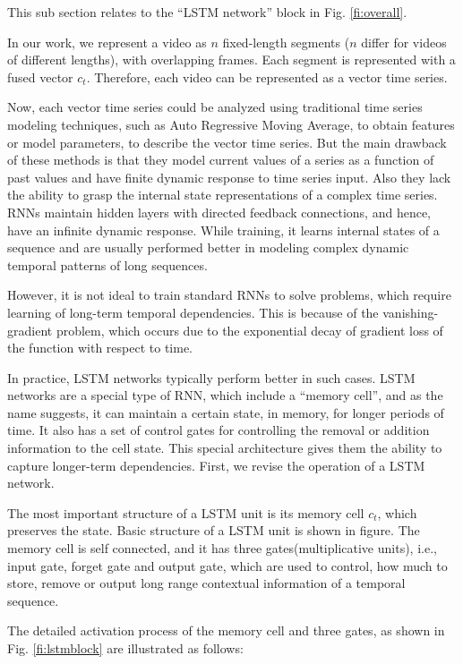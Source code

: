 This sub section relates to
the ``LSTM network'' block in Fig. \ref{fi:overall}.

In our work, we represent a video as $n$
fixed-length segments ($n$ differ for videos of different lengths),  with overlapping frames.  Each segment
is represented with a fused vector $c_{t}$. Therefore, each video can be represented as a vector time series.


Now, each vector time series could be  analyzed using traditional time series modeling techniques,
such as Auto Regressive Moving Average, to obtain features or model parameters, to describe the
vector time series.
But the main drawback of these methods is that they model current values of a series as a function of past values
and have finite dynamic response to time series input. Also they lack the ability to grasp the internal state
representations of a complex time series. RNNs maintain hidden layers with directed feedback connections, and hence,
have an infinite dynamic response. While training, it learns internal states of a sequence
and are usually performed better in modeling complex dynamic temporal patterns of long sequences.


However, it is not ideal to train standard RNNs to solve problems,
which require learning of long-term temporal dependencies. This is because of the vanishing-gradient problem, which occurs
due to the exponential decay of gradient loss of the function with respect to time.

In practice, LSTM networks typically perform better in such cases.
LSTM networks are a special type of RNN, which include a ``memory cell'', and as the name suggests,
it can maintain a certain state, in memory, for longer periods of time.
It also has a set of control gates for controlling the removal or addition information to the cell state.
This special architecture gives them the ability to capture longer-term dependencies. First, we revise the operation of a LSTM
network.

The most important structure of a LSTM unit is its memory cell $c_{t}$, which preserves the state. Basic structure of a LSTM
unit is shown in figure. The memory cell is self connected, and it has three gates(multiplicative units), i.e., input gate, forget gate and
output gate, which are used to control, how much to store, remove or output long range contextual information of a temporal sequence.

The detailed activation process of the memory cell and three gates, as shown in Fig. \ref{fi:lstmblock} are
illustrated as follows:


